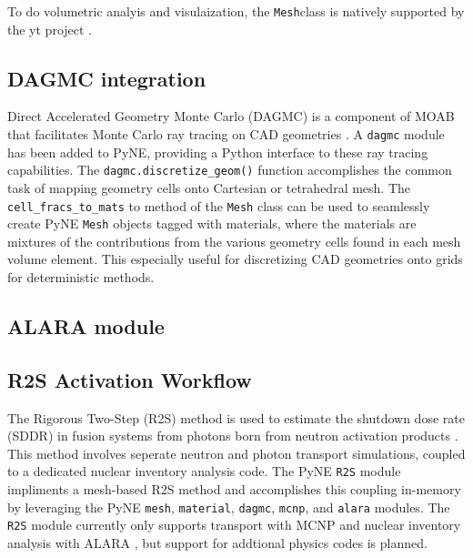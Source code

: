 \documentclass{anstrans}
\newcommand{\Mesh}{\texttt{Mesh}}
\begin{document}
To do volumetric analyis and visulaization, the \Mesh class is natively supported 
by the yt project \cite{2011ApJS..192....9T}.


\subsection{DAGMC integration}

Direct Accelerated Geometry Monte Carlo (DAGMC) is a component of MOAB that
facilitates Monte Carlo ray tracing on CAD geometries
\cite{tautges_acceleration_2009}.  A \texttt{dagmc} module has been added to
PyNE, providing a Python interface to these ray tracing capabilities. The
\texttt{dagmc.discretize\_geom()} function accomplishes the common task of
mapping geometry cells onto Cartesian or tetrahedral mesh. The
\texttt{cell\_fracs\_to\_mats} to method of the \texttt{Mesh} class can be used
to seamlessly create PyNE \texttt{Mesh} objects tagged with materials, where the
materials are mixtures of the contributions from the various geometry cells
found in each mesh volume element. This especially useful for discretizing CAD
geometries onto grids for deterministic methods.



\subsection{ALARA module}


\subsection{R2S Activation Workflow}

The Rigorous Two-Step (R2S) method is used to estimate the shutdown dose rate
(SDDR) in fusion systems from photons born from neutron activation products
\cite{chen_rigorous_2002}. This method involves seperate neutron and photon
transport simulations, coupled to a dedicated nuclear inventory analysis code.
The PyNE \texttt{R2S} module impliments a mesh-based R2S method and
accomplishes this coupling in-memory by leveraging the PyNE \texttt{mesh},
\texttt{material}, \texttt{dagmc}, \texttt{mcnp}, and \texttt{alara} modules.
The \texttt{R2S} module currently only supports transport with MCNP and nuclear
inventory analysis with ALARA \cite{wilson_validation_1998}, but support for
addtional physics codes is planned. 
\end{document}
